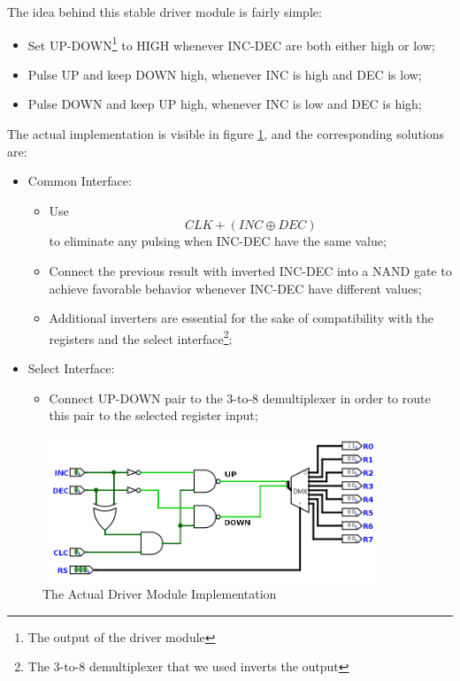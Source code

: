 The idea behind this stable driver module is fairly simple: 
\begin{itemize}
	\item Set UP-DOWN\footnote{The output of the driver module} to HIGH whenever INC-DEC are both either high or low;
	\item Pulse UP and keep DOWN high, whenever INC is high and DEC is low;
	\item Pulse DOWN and keep UP high, whenever INC is low and DEC is high;
\end{itemize}
The actual implementation is visible in figure \ref{fig:actual_driver_module_implementation}, and the corresponding solutions are:
\begin{itemize}
	\item Common Interface:
	\begin{itemize}
		\item Use $$CLK + (INC \oplus DEC)$$ to eliminate any pulsing when INC-DEC have the same value;
		\item Connect the previous result with inverted INC-DEC into a NAND gate to achieve favorable behavior whenever INC-DEC have different values;
		\item Additional inverters are essential for the sake of compatibility with the registers and the select interface\footnote{The 3-to-8 demultiplexer that we used inverts the output};
	\end{itemize}
	\item Select Interface:
	\begin{itemize}
		\item Connect UP-DOWN pair to the 3-to-8 demultiplexer in order to route this pair to the selected register input;
	\end{itemize}
\end{itemize}

\begin{figure}[H]
	\centering
	\includegraphics[width=0.9\textwidth]{img/actual_driver_module_implementation}
	\caption{The Actual Driver Module Implementation}
	\label{fig:actual_driver_module_implementation}
\end{figure}



